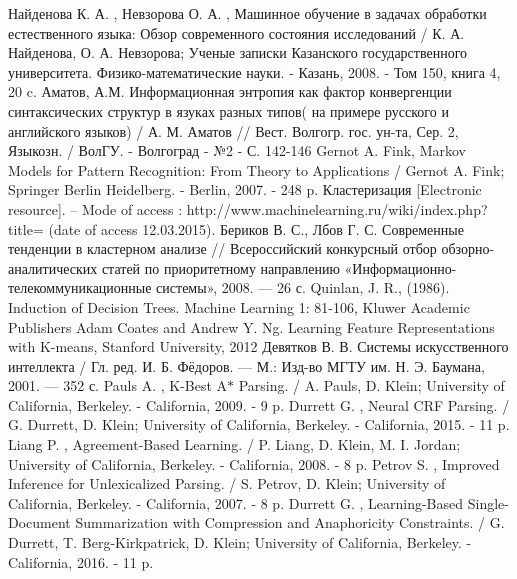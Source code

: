 \documentclass{standalone}
\begin{document}
\begin{thebibliography}{1}

 Найденова К. А. , Невзорова О. А. , Машинное обучение в задачах обработки естественного языка: Обзор современного состояния исследований / К. А. Найденова, О. А. Невзорова; Ученые записки Казанского государственного университета. Физико-математические науки. - Казань, 2008. - Том 150, книга 4, 20 c.
 Аматов, А.М. Информационная энтропия как фактор конвергенции синтаксических структур в язуках разных типов( на примере русского и английского языков) / А. М. Аматов // Вест. Волгогр. гос. ун-та, Сер. 2, Языкозн. / ВолГУ. - Волгоград - №2 - С. 142-146
 Gernot A. Fink, Markov Models for Pattern Recognition: From Theory to Applications / Gernot A. Fink; Springer Berlin Heidelberg. - Berlin, 2007. - 248 p.
 Кластеризация [Electronic resource]. – Mode of access : http://www.machinelearning.ru/wiki/index.php?title=%
(date of access 12.03.2015).
 Бериков В. С., Лбов Г. С. Современные тенденции в кластерном анализе // Всероссийский конкурсный отбор обзорно-аналитических статей по приоритетному направлению «Информационно-телекоммуникационные системы», 2008. — 26 с.
 Quinlan, J. R., (1986). Induction of Decision Trees. Machine Learning 1: 81-106, Kluwer Academic Publishers
 Adam Coates and Andrew Y. Ng. Learning Feature Representations with K-means, Stanford University, 2012
 Девятков В. В. Системы искусственного интеллекта / Гл. ред. И. Б. Фёдоров. — М.: Изд-во МГТУ им. Н. Э. Баумана, 2001. — 352 с.
 Pauls A. , K-Best A\(\ast\) Parsing. / A. Pauls, D. Klein; University of California, Berkeley. - California, 2009. - 9 p.
 Durrett G. , Neural CRF Parsing. / G. Durrett, D. Klein; University of California, Berkeley. - California, 2015. - 11 p.
 Liang P. , Agreement-Based Learning. / P. Liang, D. Klein, M. I. Jordan; University of California, Berkeley. - California, 2008. - 8 p.
 Petrov S. , Improved Inference for Unlexicalized Parsing. / S. Petrov, D. Klein; University of California, Berkeley. - California, 2007. - 8 p.
 Durrett G. , Learning-Based Single-Document Summarization with Compression and Anaphoricity Constraints. / G. Durrett, T. Berg-Kirkpatrick, D. Klein; University of California, Berkeley. - California, 2016. - 11 p.


\end{thebibliography}
\end{document}
